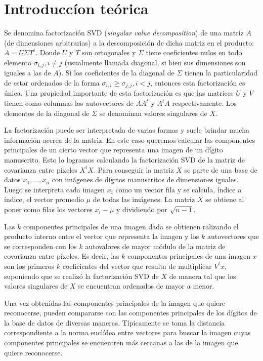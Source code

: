 \section{Introducc\'ion te\'orica}

	\PARstart Se denomina factorizaci\'on SVD (\textit{singular value decomposition})
	de una matriz $A$ (de dimensiones arbitrarias) a la descomposici\'on de dicha matriz
	en el producto: $A = U\Sigma T^{t} $. Donde $U$ y $T$ son ortogonales 
	y $\Sigma$ tiene coeficientes nulos en todo elemento $\sigma_{i,j}, i\neq j$ (usualmente
	llamada diagonal, si bien sus dimensiones son iguales a las de $A$).
	Si los coeficientes de la diagonal de $\Sigma$ tienen
	la particularidad de estar ordenados de la forma $\sigma_{i,i} \geq
	\sigma_{j,j}, i<j$, entonces esta factorizaci\'on es \'unica.
	Una propiedad importante de esta factorizaci\'on es que las matrices
	$U$ y $V$ tienen como columnas los autovectores de $AA^t$ y $A^tA$
	respectivamente.
	Los elementos de la diagonal de $\Sigma$ se denominan valores singulares
	de $X$.

	La factorizaci\'on puede ser interpretada de varias formas y suele
	brindar mucha informaci\'on acerca de la matriz. En este caso queremos
	calcular las componentes principales de un cierto vector que representa
	una imagen de un d\'igito manuscrito. Esto lo logramos calculando la
	factorizaci\'on SVD de la matriz de covarianza entre p\'ixeles $X^tX$.
	Para conseguir la matriz $X$ se parte de una base de datos $x_1, \ldots, x_n$
	con im\'agenes
	de d\'igitos manuscritos de dimensiones iguales. Luego se interpreta cada
	imagen $x_i$ como un vector fila y se calcula, \'indice a \'indice,
	el vector promedio $\mu$ de todas las im\'agenes.
	La matriz $X$ se obtiene al poner como filas los vectores $x_i - \mu$
	y dividiendo por $\sqrt{n-1}$.

	Las $k$ componentes principales de una imagen dada se obtienen ralizando
	el producto interno entre el vector que representa la imagen y los
	$k$ autovectores que se corresponden con los $k$ autovalores de mayor m\'odulo
	de la matriz de covarianza entre p\'ixeles.
	Es decir, las $k$ componentes principales de una imagen $x$ son los
	primeros $k$ coeficientes del vector que resulta de multiplicar $V^tx$,
	suponiendo que se realiz\'o la factorizaci\'on SVD de $X$ de manera tal
	que los valores singulares de $X$ se encuentran ordenados de mayor a menor. 

	Una vez obtenidas las componentes principales de la imagen que quiere
	reconocerse, pueden compararse con las componentes principales de los
	d\'igitos de la base de datos de diversas maneras. T\'ipicamente se toma
	la distancia correspondiente a la norma eucl\'idea entre vectores para
	buscar la imagen cuyas componentes principales se encuentren m\'as cercanas
	a las de la imagen que quiere reconocerse.
